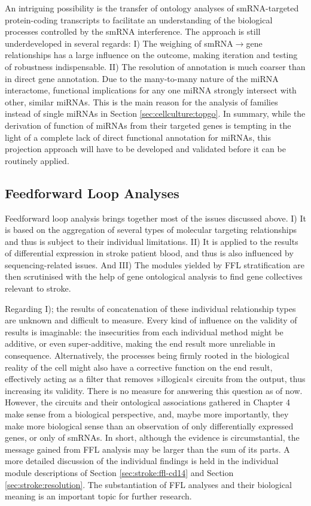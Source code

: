 An intriguing possibility is the transfer of ontology analyses of smRNA-targeted protein-coding transcripts to facilitate an understanding of the biological processes controlled by the smRNA interference. The approach is still underdeveloped in several regards: I) The weighing of smRNA$\to$gene relationships has a large influence on the outcome, making iteration and testing of robustness indispensable. II) The resolution of annotation is much coarser than in direct gene annotation. Due to the many-to-many nature of the miRNA interactome, functional implications for any one miRNA strongly intersect with other, similar miRNAs. This is the main reason for the analysis of families instead of single miRNAs in Section \ref{sec:cellculture:topgo}. In summary, while the derivation of function of miRNAs from their targeted genes is tempting in the light of a complete lack of direct functional annotation for miRNAs, this projection approach will have to be developed and validated before it can be routinely applied.

\subsection{Feedforward Loop Analyses} \label{sec:discussion:ffl}
Feedforward loop analysis brings together most of the issues discussed above. I) It is based on the aggregation of several types of molecular targeting relationships and thus is subject to their individual limitations. II) It is applied to the results of differential expression in stroke patient blood, and thus is also influenced by sequencing-related issues. And III) The modules yielded by FFL stratification are then scrutinised with the help of gene ontological analysis to find gene collectives relevant to stroke.

Regarding I); the results of concatenation of these individual relationship types are unknown and difficult to measure. Every kind of influence on the validity of results is imaginable: the insecurities from each individual method might be additive, or even super-additive, making the end result more unreliable in consequence. Alternatively, the processes being firmly rooted in the biological reality of the cell might also have a corrective function on the end result, effectively acting as a filter that removes »illogical« circuits from the output, thus increasing its validity. There is no measure for answering this question as of now. However, the circuits and their ontological associations gathered in Chapter 4 make sense from a biological perspective, and, maybe more importantly, they make more biological sense than an observation of only differentially expressed genes, or only of smRNAs. In short, although the evidence is circumstantial, the message gained from FFL analysis may be larger than the sum of its parts. A more detailed discussion of the individual findings is held in the individual module descriptions of Section \ref{sec:stroke:ffl-cd14} and Section \ref{sec:stroke:resolution}. The substantiation of FFL analyses and their biological meaning is an important topic for further research.

